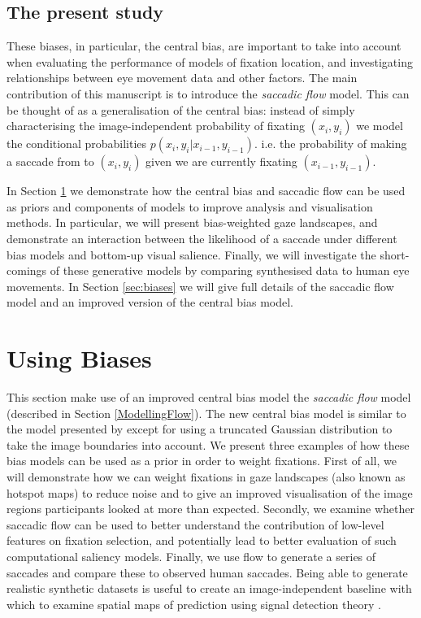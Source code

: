 \documentclass[a4paper, twocolumn, oneside, 10pt]{article}
\begin{document}
\subsection{The present study}

These biases, in particular, the central bias, are important to take into account when evaluating the performance of models of fixation location, and investigating relationships between eye movement data and other factors. The main contribution of this manuscript is to introduce the \textit{saccadic flow} model. This can be thought of as a generalisation of the central bias: instead of simply characterising the image-independent probability of fixating $(x_i, y_i)$ we model the conditional probabilities $p(x_i,y_i|x_{i-1}, y_{i-1})$. i.e. the probability of making a saccade from to $(x_i,y_i)$ given we are currently fixating $(x_{i-1}, y_{i-1})$.

In Section \ref{sec:usingbiases} we demonstrate how the central bias and saccadic flow can be used as priors and components of models to improve analysis and visualisation methods. In particular, we will present bias-weighted gaze landscapes, and demonstrate an interaction between the likelihood of a saccade under different bias models and bottom-up visual salience. Finally, we will investigate the short-comings of these generative models by comparing synthesised data to human eye movements. In Section \ref{sec:biases} we will give full details of the saccadic flow model and an improved version of the central bias model. 

\section{Using Biases}
\label{sec:usingbiases}

This section make use of an improved central bias model the \textit{saccadic flow} model (described in Section \ref{ModellingFlow}). The new central bias model is similar to the model presented by \cite{clarke-tatler2014} except for using a truncated Gaussian distribution to take the image boundaries into account. We present three examples of how these bias models can be used as a prior in order to weight fixations. First of all, we will demonstrate how we can weight fixations in gaze landscapes (also known as hotspot maps) to reduce noise and to give an improved visualisation of the image regions participants looked at more than expected. Secondly, we examine whether saccadic flow can be used to better understand the contribution of low-level features on fixation selection, and potentially lead to better evaluation of such computational saliency models. Finally, we use flow to generate a series of saccades and compare these to observed human saccades. Being able to generate realistic synthetic datasets is useful to create an image-independent baseline with which to examine spatial maps of prediction using signal detection theory \citep[see][]{clarke-tatler2014}.
\end{document}
